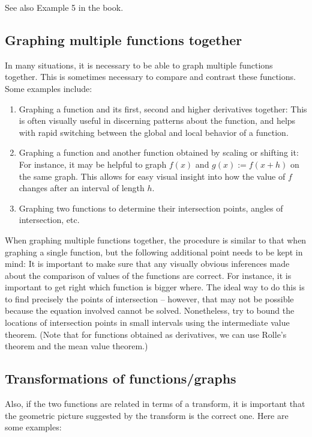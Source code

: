\documentclass[10pt]{amsart}
\begin{document}
See also Example 5 in the book.

\subsection{Graphing multiple functions together}

In many situations, it is necessary to be able to graph multiple
functions together. This is sometimes necessary to compare and
contrast these functions. Some examples include:

\begin{enumerate}
\item Graphing a function and its first, second and higher derivatives
  together: This is often visually useful in discerning patterns about
  the function, and helps with rapid switching between the global and
  local behavior of a function.
\item Graphing a function and another function obtained by scaling or
  shifting it: For instance, it may be helpful to graph $f(x)$ and
  $g(x) := f(x + h)$ on the same graph. This allows for easy visual
  insight into how the value of $f$ changes after an interval of
  length $h$.
\item Graphing two functions to determine their intersection points,
  angles of intersection, etc.
\end{enumerate}

When graphing multiple functions together, the procedure is similar to
that when graphing a single function, but the following additional
point needs to be kept in mind: It is important to make sure that any
visually obvious inferences made about the comparison of values of the
functions are correct. For instance, it is important to get right
which function is bigger where. The ideal way to do this is to find
precisely the points of intersection -- however, that may not be
possible because the equation involved cannot be solved. Nonetheless,
try to bound the locations of intersection points in small intervals
using the intermediate value theorem. (Note that for functions
obtained as derivatives, we can use Rolle's theorem and the mean value
theorem.)

\subsection{Transformations of functions/graphs}

Also, if the two functions are related in terms of a transform, it is
important that the geometric picture suggested by the transform is the
correct one. Here are some examples:
\end{document}
